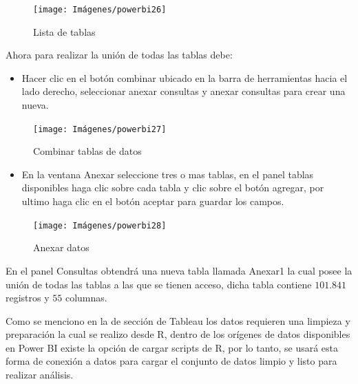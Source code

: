 \documentclass[
]{book}
\providecommand{\tightlist}{%
  \setlength{\itemsep}{0pt}\setlength{\parskip}{0pt}}
\begin{document}
\begin{figure}

{\centering \texttt{[image: Imágenes/powerbi26]} 

}

\caption{Lista de tablas}\label{fig:listamicrodatos-fig}
\end{figure}

Ahora para realizar la unión de todas las tablas debe:

\begin{itemize}
\tightlist
\item
  Hacer clic en el botón combinar ubicado en la barra de herramientas hacia el lado derecho, seleccionar anexar consultas y anexar consultas para crear una nueva.
\end{itemize}

\begin{figure}

{\centering \texttt{[image: Imágenes/powerbi27]} 

}

\caption{Combinar tablas de datos}\label{fig:combinardatos-fig}
\end{figure}

\begin{itemize}
\tightlist
\item
  En la ventana Anexar seleccione tres o mas tablas, en el panel tablas disponibles haga clic sobre cada tabla y clic sobre el botón agregar, por ultimo haga clic en el botón aceptar para guardar los campos.
\end{itemize}

\begin{figure}

{\centering \texttt{[image: Imágenes/powerbi28]} 

}

\caption{Anexar datos}\label{fig:anexardatos-fig}
\end{figure}

En el panel Consultas obtendrá una nueva tabla llamada Anexar1 la cual posee la unión de todas las tablas a las que se tienen acceso, dicha tabla contiene \(101.841\) registros y \(55\) columnas.

Como se menciono en la de sección de Tableau los datos requieren una limpieza y preparación la cual se realizo desde R, dentro de los orígenes de datos disponibles en Power BI existe la opción de cargar scripts de R, por lo tanto, se usará esta forma de conexión a datos para cargar el conjunto de datos limpio y listo para realizar análisis.
\end{document}
